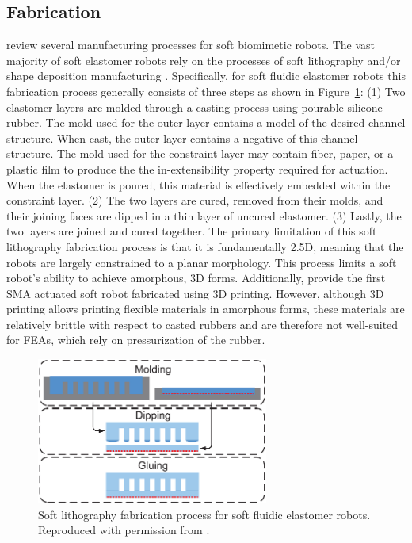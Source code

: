 \subsection{Fabrication}
\label{subsec:RW Fabrication}
\citet{cho2009review} review several manufacturing processes for soft biomimetic robots.
The vast majority of soft elastomer robots rely on the processes of soft lithography \citep{xia1998soft} and/or shape deposition manufacturing \citep{cham2002fast}.
Specifically, for soft fluidic elastomer robots this fabrication process generally consists of three steps as shown in Figure~\ref{fig:RW fabrication}: (1) Two elastomer layers are molded through a casting process using pourable silicone rubber. The mold used for the outer layer contains a model of the desired channel structure. When cast, the outer layer contains a negative of this channel structure. The mold used for the constraint layer may contain fiber, paper, or a plastic film to produce the the in-extensibility property required for actuation. When the elastomer is poured, this material is effectively embedded within the constraint layer.
(2) The two layers are cured, removed from their molds, and their joining faces are dipped in a thin layer of uncured elastomer.
(3) Lastly, the two layers are joined and cured together.
The primary limitation of this soft lithography fabrication process is that it is fundamentally 2.5D, meaning that the robots are largely constrained to a planar morphology.
This process limits a soft robot's ability to achieve amorphous, 3D forms.
Additionally, \citet{umedachi2013highly} provide the first SMA actuated soft robot fabricated using 3D printing.
However, although 3D printing allows printing flexible materials in amorphous forms, these materials are relatively brittle with respect to casted rubbers and are therefore not well-suited for FEAs, which rely on pressurization of the rubber.
\begin{figure}
  \centering
  \includegraphics[width=3in]{figures/relatedwork/fabrication.eps}
  \caption[Soft lithography fabrication process.]{Soft lithography fabrication process for soft fluidic elastomer robots. Reproduced with permission from \citet{onal2012modular}.}\label{fig:RW fabrication}
\end{figure}

